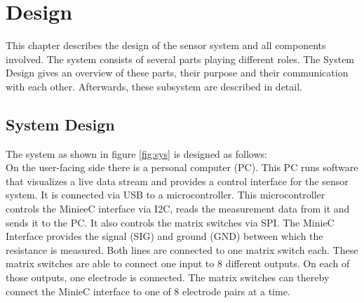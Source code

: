 \chapter{Design}

This chapter describes the design of the sensor system and all components involved. The system consists of several parts playing different roles. The System Design gives an overview of these parts, their purpose and their communication with each other. Afterwards, these subsystem are described in detail.\\

\section{System Design}

The system as shown in figure \ref{fig:sys} is designed as follows:\\
On the user-facing side there is a personal computer (PC). This PC runs software that visualizes a live data stream and provides a control interface for the sensor system. It is connected via USB to a microcontroller. This microcontroller controls the MinieeC interface via I2C, reads the measurement data from it and sends it to the PC. It also controls the matrix switches via SPI. The MinieC Interface provides the signal (SIG) and ground (GND) between which the resistance is measured. Both lines are connected to one matrix switch each. These matrix switches are able to connect one input to 8 different outputs. On each of those outputs, one electrode is connected. The matrix switches can thereby connect the MinieC interface to one of 8 electrode pairs at a time.\\

